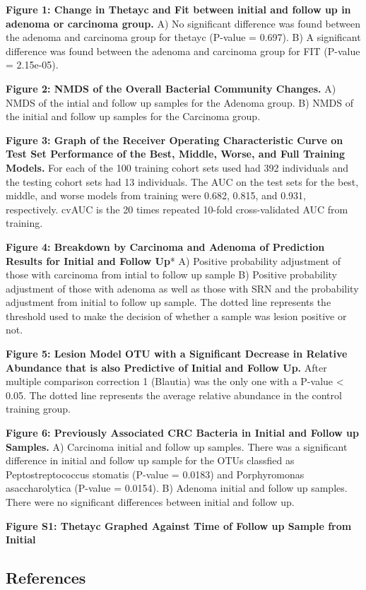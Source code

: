 \documentclass[12pt,]{article}
\begin{document}
\newpage

\textbf{Figure 1: Change in Thetayc and Fit between initial and follow
up in adenoma or carcinoma group.} A) No significant difference was
found between the adenoma and carcinoma group for thetayc (P-value =
0.697). B) A significant difference was found between the adenoma and
carcinoma group for FIT (P-value = 2.15e-05).

\textbf{Figure 2: NMDS of the Overall Bacterial Community Changes.} A)
NMDS of the intial and follow up samples for the Adenoma group. B) NMDS
of the initial and follow up samples for the Carcinoma group.

\textbf{Figure 3: Graph of the Receiver Operating Characteristic Curve
on Test Set Performance of the Best, Middle, Worse, and Full Training
Models.} For each of the 100 training cohort sets used had 392
individuals and the testing cohort sets had 13 individuals. The AUC on
the test sets for the best, middle, and worse models from training were
0.682, 0.815, and 0.931, respectively. cvAUC is the 20 times repeated
10-fold cross-validated AUC from training.

\textbf{Figure 4: Breakdown by Carcinoma and Adenoma of Prediction
Results for Initial and Follow Up}* A) Positive probability adjustment
of those with carcinoma from intial to follow up sample B) Positive
probability adjustment of those with adenoma as well as those with SRN
and the probability adjustment from initial to follow up sample. The
dotted line represents the threshold used to make the decision of
whether a sample was lesion positive or not.

\textbf{Figure 5: Lesion Model OTU with a Significant Decrease in
Relative Abundance that is also Predictive of Initial and Follow Up.}
After multiple comparison correction 1 (Blautia) was the only one with a
P-value \textless{} 0.05. The dotted line represents the average
relative abundance in the control training group.

\textbf{Figure 6: Previously Associated CRC Bacteria in Initial and
Follow up Samples.} A) Carcinoma initial and follow up samples. There
was a significant difference in initial and follow up sample for the
OTUs classfied as Peptostreptococcus stomatis (P-value = 0.0183) and
Porphyromonas asaccharolytica (P-value = 0.0154). B) Adenoma initial and
follow up samples. There were no significant differences between initial
and follow up.

\newpage

\textbf{Figure S1: Thetayc Graphed Against Time of Follow up Sample from
Initial}

\newpage

\subsection{References}\label{references}
\end{document}
